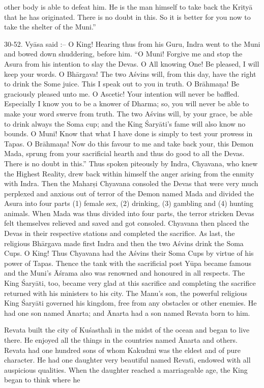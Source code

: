 other body is able to defeat him. He is the man himself to take back the Krity\=a that he has originated. There is no doubt in this. So it is better for you now to take the shelter of the Muni.''

30-52. Vy\=asa said :-- O King! Hearing thus from his Guru, Indra went to the Muni and bowed down shuddering, before him. ``O Muni! Forgive me and stop the Asura from his intention to slay the Devas. O All knowing One! Be pleased, I will keep your words. O Bh\=argava! The two A\'svins will, from this day, have the right to drink the Some juice. This I speak out to you in truth. O Br\=ahma\d{n}a! Be graciously pleased unto me. O Ascetic! Your intention will never be baffled. Especially I know you to be a knower of Dharma; so, you will never be able to make your word swerve from truth. The two A\'svins will, by your grace, be able to drink always the Soma cup; and the King \'Sary\=ati's fame will also know no bounds. O Muni! Know that what I have done is simply to test your prowess in Tapas. O Br\=ahma\d{n}a! Now do this favour to me and take back your, this Demon Mada, sprung from your sacrificial hearth and thus do good to all the Devas. There is no doubt in this.'' Thus spoken piteously by Indra, Chyavana, who knew the Highest Reality, drew back within himself the anger arising from the enmity with Indra. Then the Mahar\d{s}i Chyavana consoled the Devas that were very much perplexed and anxious out of terror of the Demon named Mada and divided the Asura into four parts (1) female sex, (2) drinking, (3) gambling and (4) hunting animals. When Mada was thus divided into four parts, the terror stricken Devas felt themselves relieved and saved and got consoled. Chyavana then placed the Devas in their respective stations and completed the sacrifice. As last, the religious Bh\=argava made first Indra and then the two A\'svins drink the Soma Cups. O King! Thus Chyavana had the A\'svins their Soma Cups by virtue of his power of Tapas. Thence the tank with the sacrificial post Y\=upa became famous and the Muni's \=A\'srama also was renowned and honoured in all respects. The King \'Sary\=ati, too, became very glad at this sacrifice and completing the sacrifice returned with his ministers to his city. The Manu's son, the powerful religious King \'Sary\=ati governed his kingdom, free from any obstacles or other enemies. He had one son named \=Anarta; and \=Anarta had a son named Revata born to him.

Revata built the city of Ku\'sasthal\={\i} in the midst of the ocean and began to live there. He enjoyed all the things in the countries named \=Anarta and others. Revata had one hundred sons of whom Kakudmi was the eldest and of pure character. He had one daughter very beautiful named Revat\={\i}, endowed with all auspicious qualities. When the daughter reached a marriageable age, the King began to think where he

